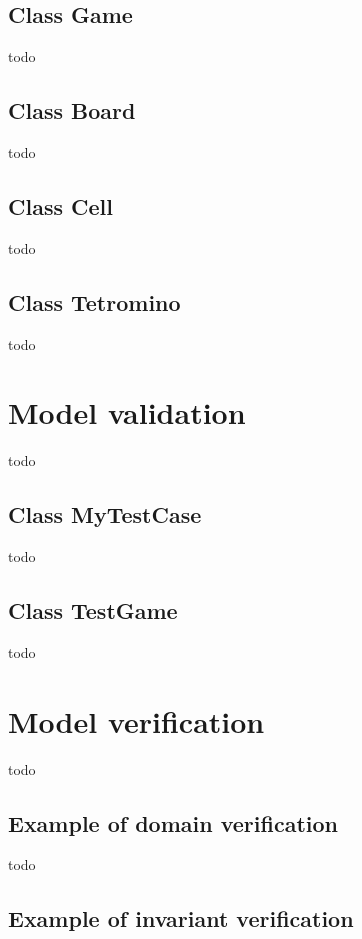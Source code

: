 \documentclass[a4paper]{article}
\begin{document}
\subsection{Class Game}

todo

\subsection{Class Board}

todo

\subsection{Class Cell}

todo

\subsection{Class Tetromino}

todo

\section{Model validation}

todo

\subsection{Class MyTestCase} 

todo

\subsection{Class TestGame} 

todo

\section{Model verification}

todo

\subsection{Example of domain verification} 

todo

\subsection{Example of invariant verification} 
\end{document}
